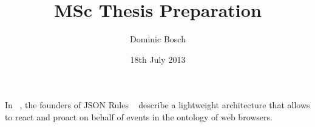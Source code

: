 \documentclass[11pt]{article}
\begin{document}
\title{MSc Thesis Preparation}
\author{Dominic Bosch}
\date{18th July 2013}
\maketitle
In ~\cite{06PascalauGiurca}, the founders of JSON Rules ~\cite{2008-Giurca_Pascalau-JSON_Rules.pdf} describe a lightweight architecture that allows to react and proact on behalf of events in the ontology of web browsers.



\end{document}

